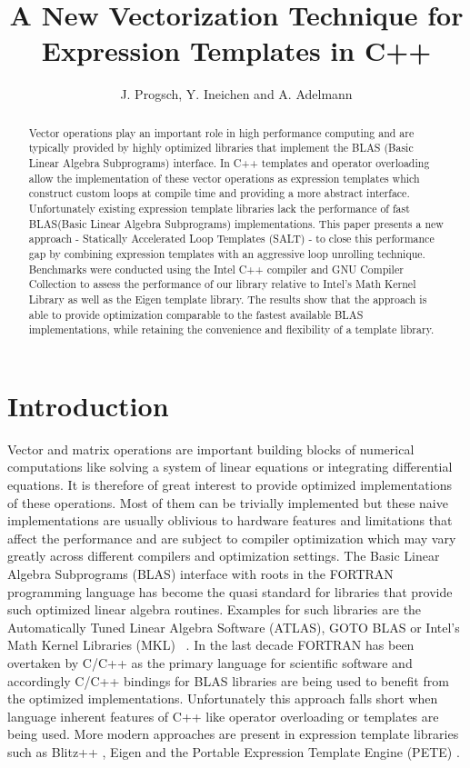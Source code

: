 \documentclass[12pt]{article}
\title{A New Vectorization Technique for Expression Templates in C++}
\author{J. Progsch, Y. Ineichen and A. Adelmann}
\begin{document}
\maketitle

\begin{abstract}
Vector operations play an important role in high performance computing and are
typically provided by highly optimized libraries that implement the BLAS (Basic Linear Algebra Subprograms) 
interface. In C++ templates and operator overloading allow the implementation of
these vector operations as expression templates which construct custom loops
at compile time and providing a more abstract interface.
Unfortunately existing expression template libraries lack the performance
of fast BLAS(Basic Linear Algebra Subprograms) implementations. This paper presents
a new approach - Statically Accelerated Loop Templates (SALT) - to close
this performance gap by combining expression templates with an aggressive loop
unrolling technique. Benchmarks were conducted using the Intel C++ compiler and
GNU Compiler Collection to assess the performance of our library
relative to Intel's Math Kernel Library as well as the Eigen template library.
The results show that the approach is able to provide optimization comparable
to the fastest available BLAS implementations, while retaining the convenience
and flexibility of a template library.
\end{abstract}

\section{Introduction}

Vector and matrix operations are important building blocks of numerical
computations like solving a system of linear equations or integrating differential
equations. It is therefore of great interest to provide optimized
implementations of these operations. Most of them can be trivially implemented
but these naive implementations are usually oblivious to hardware features and
limitations that affect the performance and are subject to compiler optimization
which may vary greatly across different compilers and optimization settings. The
Basic Linear Algebra Subprograms (BLAS) interface with roots in the
FORTRAN programming language has become the quasi standard for libraries that
provide such optimized linear algebra routines. Examples for such libraries are the
Automatically Tuned Linear Algebra Software (ATLAS), GOTO BLAS or Intel's Math Kernel
Libraries (MKL) ~\cite{intelmkl}. In the last decade
FORTRAN has been overtaken by C/C++ as the primary language for scientific
software and accordingly C/C++ bindings for BLAS libraries are being used to
benefit from the optimized implementations. Unfortunately this approach falls
short when language inherent features of C++ like operator
overloading or templates are being used. More modern approaches are present in expression
template libraries such as Blitz++ \cite{blitzpp}, Eigen \cite{eigenweb}
and the Portable Expression Template Engine (PETE) \cite{pete}.
\end{document}
